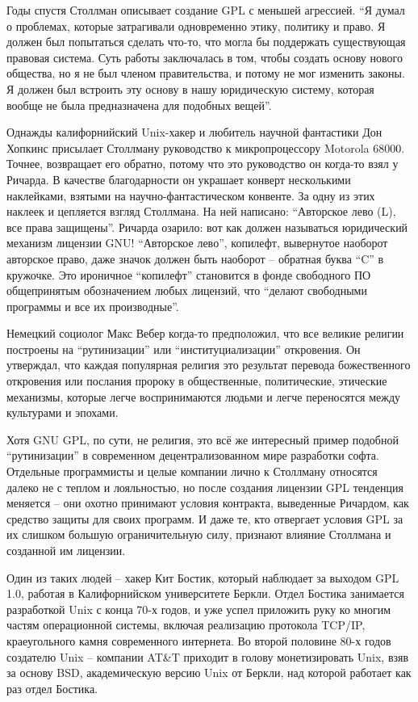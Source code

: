 Годы спустя Столлман описывает создание GPL с меньшей агрессией. \enquote{Я думал о проблемах, которые затрагивали одновременно этику, политику и право. Я должен был попытаться сделать что-то, что могла бы поддержать существующая правовая система. Суть работы заключалась в том, чтобы создать основу нового общества, но я не был членом правительства, и потому не мог изменить законы. Я должен был встроить эту основу в нашу юридическую систему, которая вообще не была предназначена для подобных вещей}.

Однажды калифорнийский Unix-хакер и любитель научной фантастики Дон Хопкинс присылает Столлману руководство к микропроцессору Motorola 68000. Точнее, возвращает его обратно, потому что это руководство он когда-то взял у Ричарда. В качестве благодарности он украшает конверт несколькими наклейками, взятыми на научно-фантастическом конвенте. За одну из этих наклеек и цепляется взгляд Столлмана. На ней написано: \enquote{Авторское лево (L), все права защищены}. Ричарда озарило: вот как должен называться юридический механизм лицензии GNU! \enquote{Авторское лево}, копилефт, вывернутое наоборот авторское право, даже значок должен быть наоборот -- обратная буква \enquote{C} в кружочке. Это ироничное \enquote{копилефт} становится в фонде свободного ПО общепринятым обозначением любых лицензий, что \enquote{делают свободными программы и все их производные}.

Немецкий социолог Макс Вебер когда-то предположил, что все великие религии построены на \enquote{рутинизации} или \enquote{институциализации} откровения. Он утверждал, что каждая популярная религия это результат перевода божественного откровения или послания пророку в общественные, политические, этические механизмы, которые легче воспринимаются людьми и легче переносятся между культурами и эпохами.

Хотя GNU GPL, по сути, не религия, это всё же интересный пример подобной \enquote{рутинизации} в современном децентрализованном мире разработки софта. Отдельные программисты и целые компании лично к Столлману относятся далеко не с теплом и лояльностью, но после создания лицензии GPL тенденция меняется -- они охотно принимают условия контракта, выведенные Ричардом, как средство защиты для своих программ. И даже те, кто отвергает условия GPL за их слишком большую ограничительную силу, признают влияние Столлмана и созданной им лицензии.

Один из таких людей -- хакер Кит Бостик, который наблюдает за выходом GPL 1.0, работая в Калифорнийском университете Беркли. Отдел Бостика занимается разработкой Unix с конца 70-х годов, и уже успел приложить руку ко многим частям операционной системы, включая реализацию протокола TCP/IP, краеугольного камня современного интернета. Во второй половине 80-х годов создателю Unix -- компании AT\&T приходит в голову монетизировать Unix, взяв за основу BSD, академическую версию Unix от Беркли, над которой работает как раз отдел Бостика.

